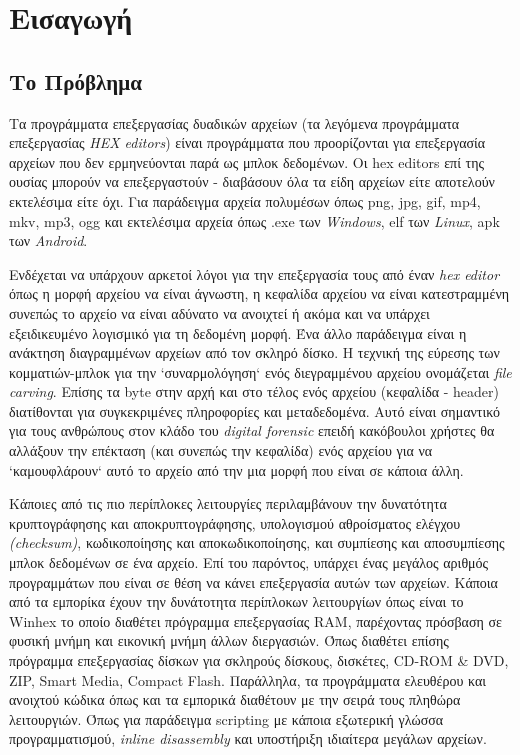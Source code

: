\section{Εισαγωγή}
\subsection{Το Πρόβλημα}
Τα προγράμματα επεξεργασίας δυαδικών αρχείων (τα λεγόμενα προγράμματα επεξεργασίας \emph{HEX editors}) είναι προγράμματα που προορίζονται για επεξεργασία αρχείων που δεν ερμηνεύονται παρά ως μπλοκ δεδομένων.
Οι hex editors επί της ουσίας μπορούν να επεξεργαστούν - διαβάσουν όλα τα είδη αρχείων είτε αποτελούν εκτελέσιμα είτε όχι. Για παράδειγμα αρχεία πολυμέσων όπως png, jpg, gif, mp4, mkv, mp3, ogg και εκτελέσιμα αρχεία όπως .exe των \emph{Windows}, elf των \emph{Linux}, apk των \emph{Android}.

Ενδέχεται να υπάρχουν αρκετοί λόγοι για την επεξεργασία τους από έναν \emph{hex editor} όπως η μορφή αρχείου να είναι άγνωστη, η κεφαλίδα αρχείου να είναι κατεστραμμένη συνεπώς το αρχείο να είναι αδύνατο να ανοιχτεί ή ακόμα και να υπάρχει εξειδικευμένο λογισμικό για τη δεδομένη μορφή.
Ένα άλλο παράδειγμα είναι η ανάκτηση διαγραμμένων αρχείων από τον σκληρό δίσκο. Η τεχνική της εύρεσης των κομματιών-μπλοκ για την `συναρμολόγηση` ενός διεγραμμένου αρχείου ονομάζεται \emph{file carving}.
Επίσης τα byte στην αρχή και στο τέλος ενός αρχείου (κεφαλίδα - header) διατίθονται για συγκεκριμένες πληροφορίες και μεταδεδομένα.
Αυτό είναι σημαντικό για τους ανθρώπους στον κλάδο του \emph{digital forensic} επειδή κακόβουλοι χρήστες θα αλλάξουν την επέκταση (και συνεπώς την κεφαλίδα) ενός αρχείου για να `καμουφλάρουν` αυτό το αρχείο από την μια μορφή που είναι σε κάποια άλλη.

Κάποιες από τις πιο περίπλοκες λειτουργίες περιλαμβάνουν την δυνατότητα κρυπτογράφησης και αποκρυπτογράφησης, υπολογισμού αθροίσματος ελέγχου \emph{(checksum)}, κωδικοποίησης και αποκωδικοποίησης, και συμπίεσης και αποσυμπίεσης μπλοκ δεδομένων σε ένα αρχείο.
Επί του παρόντος, υπάρχει ένας μεγάλος αριθμός προγραμμάτων που είναι σε θέση να κάνει επεξεργασία αυτών των αρχείων.
Κάποια από τα εμπορίκα έχουν την δυνάτοτητα περίπλοκων λειτουργίων όπως είναι το Winhex το οποίο διαθέτει πρόγραμμα επεξεργασίας RAM, παρέχοντας πρόσβαση σε φυσική μνήμη και εικονική μνήμη άλλων διεργασιών.
Όπως διαθέτει επίσης πρόγραμμα επεξεργασίας δίσκων για σκληρούς δίσκους, δισκέτες, CD-ROM & DVD, ZIP, Smart Media, Compact Flash.
Παράλληλα, τα προγράμματα ελευθέρου και ανοιχτού κώδικα όπως και τα εμπορικά διαθέτουν με την σειρά τους πληθώρα λειτουργιών.
Όπως για παράδειγμα scripting με κάποια εξωτερική γλώσσα προγραμματισμού, \emph{inline disassembly} και υποστήριξη ιδιαίτερα μεγάλων αρχείων.

